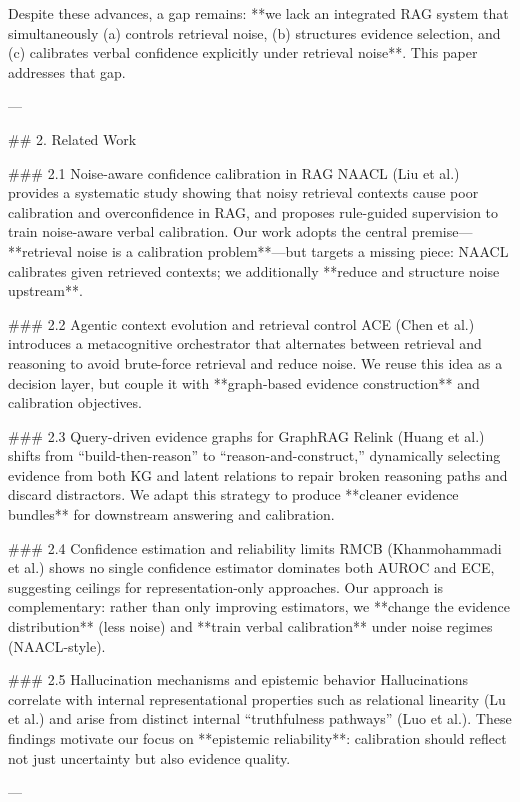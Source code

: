 Despite these advances, a gap remains: **we lack an integrated RAG system that simultaneously (a) controls retrieval noise, (b) structures evidence selection, and (c) calibrates verbal confidence explicitly under retrieval noise**. This paper addresses that gap.

---

## 2. Related Work  

### 2.1 Noise-aware confidence calibration in RAG  
NAACL (Liu et al.) provides a systematic study showing that noisy retrieval contexts cause poor calibration and overconfidence in RAG, and proposes rule-guided supervision to train noise-aware verbal calibration. Our work adopts the central premise—**retrieval noise is a calibration problem**—but targets a missing piece: NAACL calibrates given retrieved contexts; we additionally **reduce and structure noise upstream**.

### 2.2 Agentic context evolution and retrieval control  
ACE (Chen et al.) introduces a metacognitive orchestrator that alternates between retrieval and reasoning to avoid brute-force retrieval and reduce noise. We reuse this idea as a decision layer, but couple it with **graph-based evidence construction** and calibration objectives.

### 2.3 Query-driven evidence graphs for GraphRAG  
Relink (Huang et al.) shifts from “build-then-reason” to “reason-and-construct,” dynamically selecting evidence from both KG and latent relations to repair broken reasoning paths and discard distractors. We adapt this strategy to produce **cleaner evidence bundles** for downstream answering and calibration.

### 2.4 Confidence estimation and reliability limits  
RMCB (Khanmohammadi et al.) shows no single confidence estimator dominates both AUROC and ECE, suggesting ceilings for representation-only approaches. Our approach is complementary: rather than only improving estimators, we **change the evidence distribution** (less noise) and **train verbal calibration** under noise regimes (NAACL-style).

### 2.5 Hallucination mechanisms and epistemic behavior  
Hallucinations correlate with internal representational properties such as relational linearity (Lu et al.) and arise from distinct internal “truthfulness pathways” (Luo et al.). These findings motivate our focus on **epistemic reliability**: calibration should reflect not just uncertainty but also evidence quality.

---

